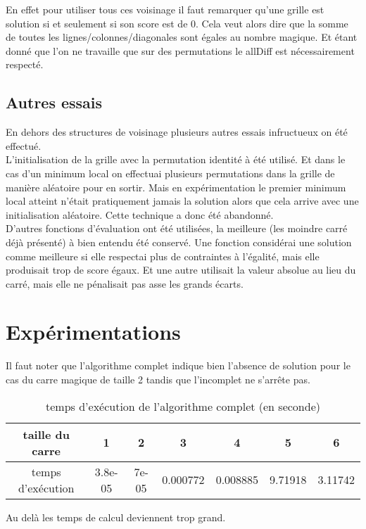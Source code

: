 \documentclass[12pt,a4paper]{article}
\begin{document}
En effet pour utiliser tous ces voisinage il faut remarquer qu'une grille est solution si et seulement si son score est de 0. Cela veut alors dire que la somme de toutes les lignes/colonnes/diagonales sont égales au nombre magique. Et étant donné que l'on ne travaille que sur des permutations le allDiff est nécessairement respecté.

\subsection{Autres essais}

En dehors des structures de voisinage plusieurs autres essais infructueux on été effectué.\\

L'initialisation de la grille avec la permutation identité à été utilisé. Et dans le cas d'un minimum local on effectuai plusieurs permutations dans la grille de manière aléatoire pour en sortir. Mais en expérimentation le premier minimum local atteint n’était pratiquement jamais la solution alors que cela arrive avec une initialisation aléatoire. Cette technique a donc été abandonné.\\

D'autres fonctions d'évaluation ont été utilisées, la meilleure (les moindre carré déjà présenté) à bien entendu été conservé. Une fonction considérai une solution comme meilleure si elle respectai plus de contraintes à l'égalité, mais elle produisait trop de score égaux. Et une autre utilisait la valeur absolue au lieu du carré, mais elle ne pénalisait pas asse les grands écarts.

\newpage

\section{Expérimentations}

Il faut noter que l'algorithme complet indique bien l’absence de solution pour le cas du carre magique de taille 2 tandis que l'incomplet ne s'arrête pas.

\begin{table}[!h]
\centering
\begin{tabular}{|*{7}{c|}}
  \hline
  taille du carre & 1 & 2 & 3 & 4 & 5 & 6 \\
  \hline
  temps d’exécution & 3.8e-05 & 7e-05 & 0.000772 & 0.008885 & 9.71918 & 3.11742 \\
  \hline
\end{tabular}
\caption{temps d’exécution de l'algorithme complet (en seconde)}
\label{complet}
\end{table}
Au delà les temps de calcul deviennent trop grand.
\end{document}
